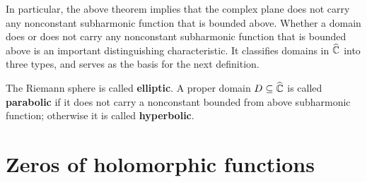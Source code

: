 In particular, the above theorem implies that the complex plane does not carry any nonconstant subharmonic function that is bounded above. Whether a domain does or does not carry any nonconstant subharmonic function that is bounded above is an important distinguishing characteristic. It classifies domains in $\widehat{\mathbb{C}}$ into three types, and serves as the basis for the next definition.
\begin{definition}
The Riemann sphere is called \textbf{elliptic}. A proper domain $D\subseteq\widehat{\mathbb{C}}$ is called \textbf{parabolic} if it does not carry a nonconstant bounded from above subharmonic function; otherwise it is called \textbf{hyperbolic}.
\end{definition}
\section{Zeros of holomorphic functions}
